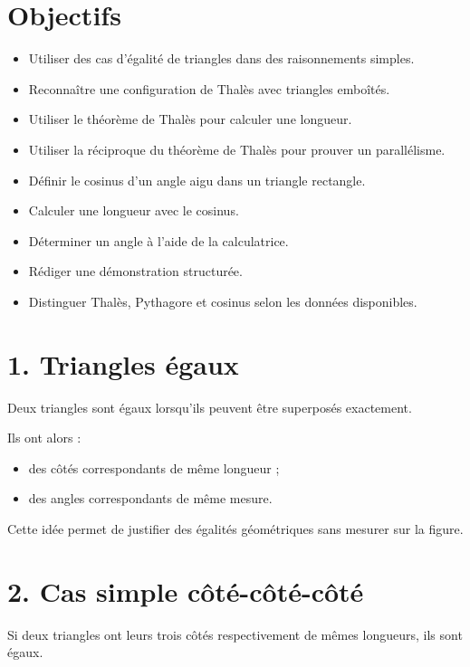 
\section{Objectifs}

\begin{itemize}
\item Utiliser des cas d'égalité de triangles dans des raisonnements simples.
\item Reconnaître une configuration de Thalès avec triangles emboîtés.
\item Utiliser le théorème de Thalès pour calculer une longueur.
\item Utiliser la réciproque du théorème de Thalès pour prouver un parallélisme.
\item Définir le cosinus d'un angle aigu dans un triangle rectangle.
\item Calculer une longueur avec le cosinus.
\item Déterminer un angle à l'aide de la calculatrice.
\item Rédiger une démonstration structurée.
\item Distinguer Thalès, Pythagore et cosinus selon les données disponibles.
\end{itemize}

\section{1. Triangles égaux}

Deux triangles sont égaux lorsqu'ils peuvent être superposés exactement.

Ils ont alors :
\begin{itemize}
\item des côtés correspondants de même longueur ;
\item des angles correspondants de même mesure.
\end{itemize}

Cette idée permet de justifier des égalités géométriques sans mesurer sur la figure.

\section{2. Cas simple côté-côté-côté}

Si deux triangles ont leurs trois côtés respectivement de mêmes longueurs, ils sont égaux.

